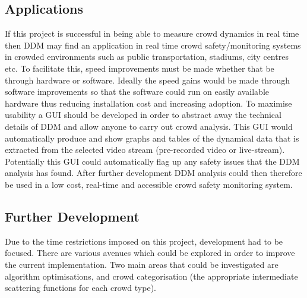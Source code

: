 \documentclass[11pt]{article}
\begin{document}
\subsection{Applications}
If this project is successful in being able to measure crowd dynamics in real time then DDM may find an application in real time crowd safety/monitoring systems in crowded environments such as public transportation, stadiums, city centres etc. To facilitate this, speed improvements must be made whether that be through hardware or software. Ideally the speed gains would be made through software improvements so that the software could run on easily available hardware thus reducing installation cost and increasing adoption. To maximise usability a GUI should be developed in order to abstract away the technical details of DDM and allow anyone to carry out crowd analysis. This GUI would automatically produce and show graphs and tables of the dynamical data that is extracted from the selected video stream (pre-recorded video or live-stream). Potentially this GUI could automatically flag up any safety issues that the DDM analysis has found. After further development DDM analysis could then therefore be used in a low cost, real-time and accessible crowd safety monitoring system.

\subsection{Further Development}
Due to the time restrictions imposed on this project, development had to be focused. There are various avenues which could be explored in order to improve the current implementation. Two main areas that could be investigated are algorithm optimisations, and crowd categorisation (the appropriate intermediate scattering functions for each crowd type).
\end{document}
